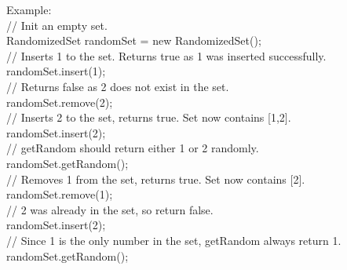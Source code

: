 Example:\\
// Init an empty set.\\
RandomizedSet randomSet = new RandomizedSet();\\

// Inserts 1 to the set. Returns true as 1 was inserted successfully.\\
randomSet.insert(1);\\

// Returns false as 2 does not exist in the set.\\
randomSet.remove(2);\\

// Inserts 2 to the set, returns true. Set now contains [1,2].\\
randomSet.insert(2);\\

// getRandom should return either 1 or 2 randomly.\\
randomSet.getRandom();\\

// Removes 1 from the set, returns true. Set now contains [2].\\
randomSet.remove(1);\\

// 2 was already in the set, so return false.\\
randomSet.insert(2);\\

// Since 1 is the only number in the set, getRandom always return 1.\\
randomSet.getRandom();\\

